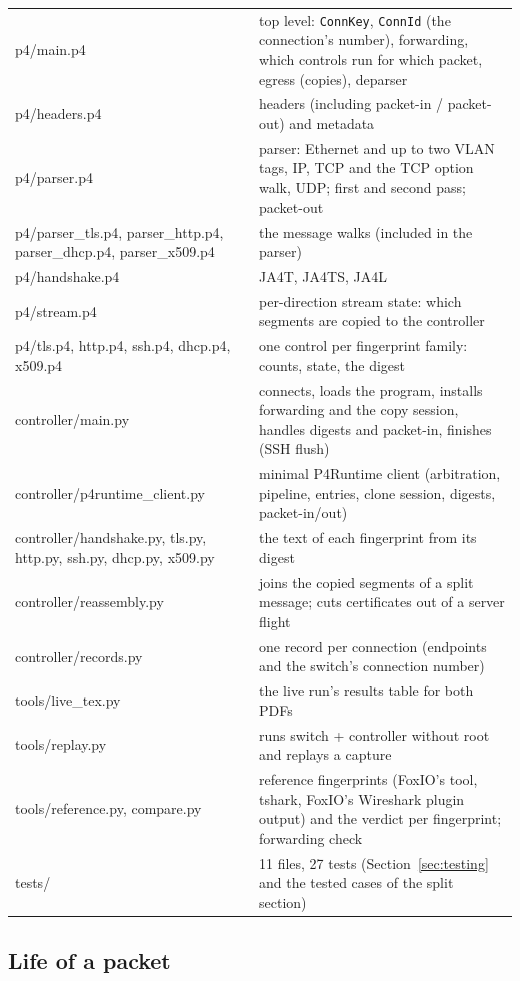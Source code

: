 \documentclass[11pt,a4paper]{article}
\newcommand{\code}[1]{\texttt{#1}}
\begin{document}
\begin{tabularx}{\textwidth}{>{\ttfamily}l X}
\toprule
p4/main.p4 & top level: \code{ConnKey}, \code{ConnId} (the connection's number), forwarding, which controls run for which packet, egress (copies), deparser \\
p4/headers.p4 & headers (including packet-in / packet-out) and metadata \\
p4/parser.p4 & parser: Ethernet and up to two VLAN tags, IP, TCP and the TCP option walk, UDP; first and second pass; packet-out \\
p4/parser\_tls.p4, parser\_http.p4, parser\_dhcp.p4, parser\_x509.p4 & the message walks (included in the parser) \\
p4/handshake.p4 & JA4T, JA4TS, JA4L \\
p4/stream.p4 & per-direction stream state: which segments are copied to the controller \\
p4/tls.p4, http.p4, ssh.p4, dhcp.p4, x509.p4 & one control per fingerprint family: counts, state, the digest \\
controller/main.py & connects, loads the program, installs forwarding and the copy session, handles digests and packet-in, finishes (SSH flush) \\
controller/p4runtime\_client.py & minimal P4Runtime client (arbitration, pipeline, entries, clone session, digests, packet-in/out) \\
controller/handshake.py, tls.py, http.py, ssh.py, dhcp.py, x509.py & the text of each fingerprint from its digest \\
controller/reassembly.py & joins the copied segments of a split message; cuts certificates out of a server flight \\
controller/records.py & one record per connection (endpoints and the switch's connection number) \\
tools/live\_tex.py & the live run's results table for both PDFs \\
tools/replay.py & runs switch + controller without root and replays a capture \\
tools/reference.py, compare.py & reference fingerprints (FoxIO's tool, tshark, FoxIO's Wireshark plugin output) and the verdict per fingerprint; forwarding check \\
tests/ & 11 files, 27 tests (Section~\ref{sec:testing} and the tested cases of the split section) \\
\bottomrule
\end{tabularx}

\subsection{Life of a packet}
\end{document}
